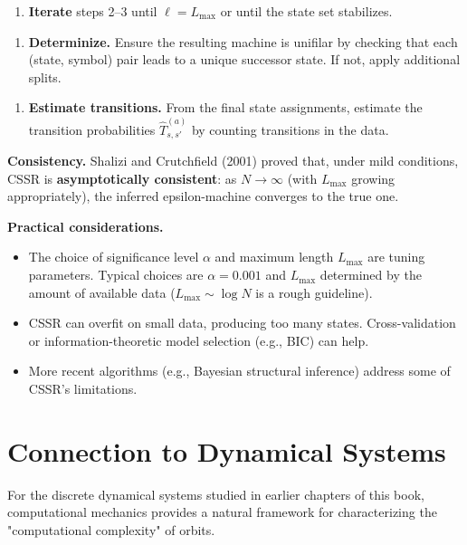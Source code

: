 \begin{enumerate}
\item \textbf{Iterate} steps 2--3 until $\ell = L_{\max}$ or until the state set stabilizes.
\end{enumerate}

\begin{enumerate}
\item \textbf{Determinize.} Ensure the resulting machine is unifilar by checking that each (state, symbol) pair leads to a unique successor state. If not, apply additional splits.
\end{enumerate}

\begin{enumerate}
\item \textbf{Estimate transitions.} From the final state assignments, estimate the transition probabilities $\hat{T}^{(a)}_{s,s'}$ by counting transitions in the data.
\end{enumerate}

\textbf{Consistency.} Shalizi and Crutchfield (2001) proved that, under mild conditions, CSSR is \textbf{asymptotically consistent}: as $N \to \infty$ (with $L_{\max}$ growing appropriately), the inferred epsilon-machine converges to the true one.

\textbf{Practical considerations.}
\begin{itemize}
\item The choice of significance level $\alpha$ and maximum length $L_{\max}$ are tuning parameters. Typical choices are $\alpha = 0.001$ and $L_{\max}$ determined by the amount of available data ($L_{\max} \sim \log N$ is a rough guideline).
\item CSSR can overfit on small data, producing too many states. Cross-validation or information-theoretic model selection (e.g., BIC) can help.
\item More recent algorithms (e.g., Bayesian structural inference) address some of CSSR's limitations.
\end{itemize}



\section{Connection to Dynamical Systems}

For the discrete dynamical systems studied in earlier chapters of this book, computational mechanics provides a natural framework for characterizing the "computational complexity" of orbits.

